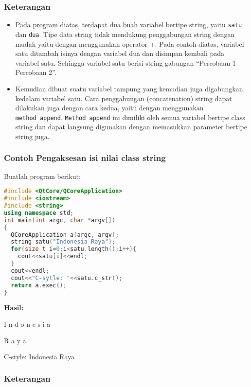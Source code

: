 \subsubsection*{Keterangan}

\begin{itemize}

\item
  Pada program diatas, terdapat dua buah variabel bertipe string, yaitu
  \texttt{satu} dan \texttt{dua}. Tipe data string tidak mendukung
  penggabungan string dengan mudah yaitu dengan menggunakan operator +.
  Pada contoh diatas, variabel satu ditambah isinya dengan variabel dua
  dan disimpan kembali pada variabel satu. Sehingga variabel satu berisi
  string gabungan ``Percobaan 1 Percobaan 2''.
\item
  Kemudian dibuat suatu variabel tampung yang kemudian juga digabungkan
  kedalam variabel satu. Cara penggabungan (concatenation) string dapat
  dilakukan juga dengan cara kedua, yaitu dengan menggunakan
  \texttt{method\ append}. \texttt{Method\ append} ini dimiliki oleh
  semua variabel bertipe class string dan dapat langsung digunakan
  dengan memasukkan parameter bertipe string juga.
\end{itemize}

\subsubsection*{Contoh  Pengaksesan isi nilai class string}

Buatlah program berikut:

\begin{lstlisting}[language=c++, caption=Pengaksesan isi nilai class string, label=contoh3-28]
#include <QtCore/QCoreApplication>
#include <iostream>
#include <string>
using namespace std;
int main(int argc, char *argv[])
{
  QCoreApplication a(argc, argv);
  string satu("Indonesia Raya");
  for(size_t i=0;i<satu.length();i++){
    cout<<satu[i]<<endl;
  }
  cout<<endl;
  cout<<"C-sytle: "<<satu.c_str();
  return a.exec();
}
\end{lstlisting}

\textbf{Hasil:}

\begin{lcverbatim}
I
n
d
o
n
e
s
i
a


R
a
y
a

C-style: Indonesia Raya
\end{lcverbatim}

\subsubsection*{Keterangan}

